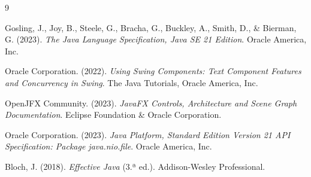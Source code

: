 \documentclass[letterpaper,12pt,oneside]{article}
\numberwithin{figure}{section}
\begin{document}
\begin{thebibliography}{9}

Gosling, J., Joy, B., Steele, G., Bracha, G., Buckley, A., Smith, D., \& Bierman, G. (2023).
\textit{The Java Language Specification, Java SE 21 Edition}.
Oracle America, Inc.

Oracle Corporation. (2022).
\textit{Using Swing Components: Text Component Features and Concurrency in Swing}.
The Java Tutorials, Oracle America, Inc.

OpenJFX Community. (2023).
\textit{JavaFX Controls, Architecture and Scene Graph Documentation}.
Eclipse Foundation \& Oracle Corporation.

Oracle Corporation. (2023).
\textit{Java Platform, Standard Edition Version 21 API Specification: Package java.nio.file}.
Oracle America, Inc.

Bloch, J. (2018).
\textit{Effective Java} (3.ª ed.).
Addison-Wesley Professional.

\end{thebibliography}
\end{document}
